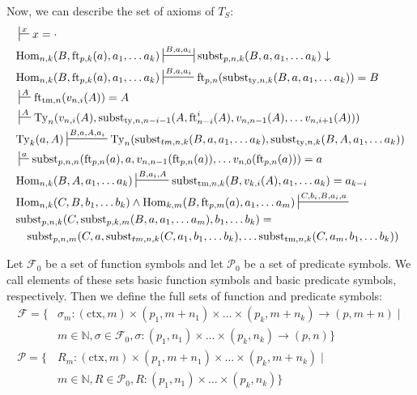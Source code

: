 \documentclass[reqno]{amsart}
\theoremstyle{definition}
\theoremstyle{remark}
\newcommand{\fs}[1]{\mathrm{#1}}
\newcommand{\subst}{\fs{subst}}
\newcommand{\Hom}{\fs{Hom}}
\newcommand{\emptyCtx}{\cdot}
\newcommand{\ft}{\fs{ft}}
\newcommand{\ty}{\fs{ty}}
\newcommand{\Ty}{\fs{Ty}}
\newcommand{\ctx}{\fs{ctx}}
\newcommand{\tm}{\fs{tm}}
\numberwithin{figure}{section}
\begin{document}
Now, we can describe the set of axioms of $T_S$:
\begin{align*}
& \sststile{}{x} x = \emptyCtx \\
& \Hom_{n,k}(B, \ft_{p,k}(a), a_1, \ldots a_k) \ssststile{}{B, a, a_i}  \subst_{p,n,k}(B, a, a_1, \ldots a_k) \downarrow \\
& \Hom_{n,k}(B, \ft_{p,k}(a), a_1, \ldots a_k) \sststile{}{B, a, a_i} \ft_{p,n}(\subst_{\ty,n,k}(B, a, a_1, \ldots a_k)) = B \\
& \sststile{}{A} \ft_{\tm,n}(v_{n,i}(A)) = A \\
& \sststile{}{A} \Ty_n(v_{n,i}(A), \subst_{\ty,n,n-i-1}(A, \ft^i_{n-i}(A), v_{n,n-1}(A), \ldots v_{n,i+1}(A))) \\
& \Ty_k(a,A) \sststile{}{B, a, A, a_i} \Ty_n(\subst_{tm,n,k}(B, a, a_1, \ldots a_k), \subst_{\ty,n,k}(B, A, a_1, \ldots a_k)) \\
& \sststile{}{a} \subst_{p,n,n}(\ft_{p,n}(a), a, v_{n,n-1}(\ft_{p,n}(a)), \ldots v_{n,0}(\ft_{p,n}(a))) = a \\
& \Hom_{n,k}(B, A, a_1, \ldots a_k) \sststile{}{B, a_i, A} \subst_{\tm,n,k}(B, v_{k,i}(A), a_1, \ldots a_k) = a_{k-i} \\
& \Hom_{n,k}(C, B, b_1, \ldots b_k) \land \Hom_{k,m}(B, \ft_{p,m}(a), a_1, \ldots a_m) \sststile{}{C, b_i, B, a_i, a} \\
& \subst_{p,n,k}(C, \subst_{p,k,m}(B, a, a_1, \ldots a_m), b_1, \ldots b_k) = \\
& \quad \subst_{p,n,m}(C, a, \subst_{tm,n,k}(C, a_1, b_1, \ldots b_k), \ldots \subst_{\tm,n,k}(C, a_m, b_1, \ldots b_k))
\end{align*}

Let $\mathcal{F}_0$ be a set of function symbols and let $\mathcal{P}_0$ be a set of predicate symbols.
We call elements of these sets basic function symbols and basic predicate symbols, respectively.
Then we define the full sets of function and predicate symbols:
\begin{align*}
\mathcal{F} = \{ & \sigma_m : (\ctx,m) \times (p_1,m+n_1) \times \ldots \times (p_k,m+n_k) \to (p,m+n) \mid \\
                 & m \in \mathbb{N}, \sigma \in \mathcal{F}_0, \sigma : (p_1,n_1) \times \ldots \times (p_k,n_k) \to (p,n) \} \\
\mathcal{P} = \{ & R_m : (\ctx,m) \times (p_1,m+n_1) \times \ldots \times (p_k,m+n_k) \mid \\
                 & m \in \mathbb{N}, R \in \mathcal{P}_0, R : (p_1,n_1) \times \ldots \times (p_k,n_k) \}
\end{align*}
\end{document}
